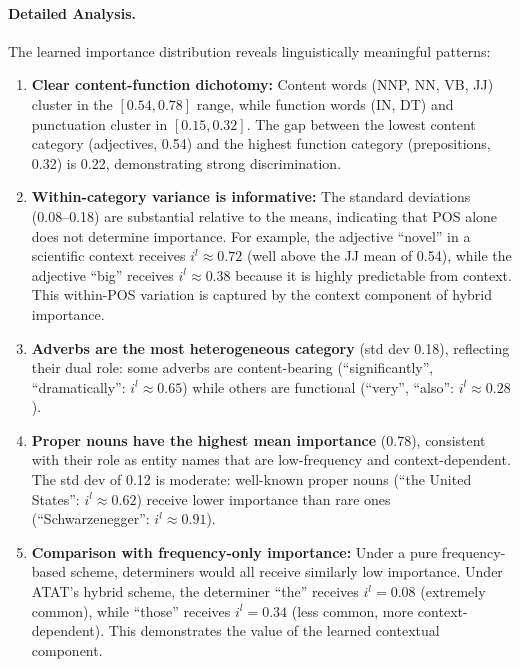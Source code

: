 \paragraph{Detailed Analysis.} The learned importance distribution reveals linguistically meaningful patterns:

\begin{enumerate}[leftmargin=*,itemsep=2pt]
    \item \textbf{Clear content-function dichotomy:} Content words (NNP, NN, VB, JJ) cluster in the $[0.54, 0.78]$ range, while function words (IN, DT) and punctuation cluster in $[0.15, 0.32]$. The gap between the lowest content category (adjectives, 0.54) and the highest function category (prepositions, 0.32) is 0.22, demonstrating strong discrimination.
    
    \item \textbf{Within-category variance is informative:} The standard deviations (0.08--0.18) are substantial relative to the means, indicating that POS alone does not determine importance. For example, the adjective ``novel'' in a scientific context receives $i^l \approx 0.72$ (well above the JJ mean of 0.54), while the adjective ``big'' receives $i^l \approx 0.38$ because it is highly predictable from context. This within-POS variation is captured by the context component of hybrid importance.
    
    \item \textbf{Adverbs are the most heterogeneous category} (std dev 0.18), reflecting their dual role: some adverbs are content-bearing (``significantly'', ``dramatically'': $i^l \approx 0.65$) while others are functional (``very'', ``also'': $i^l \approx 0.28$).
    
    \item \textbf{Proper nouns have the highest mean importance} (0.78), consistent with their role as entity names that are low-frequency and context-dependent. The std dev of 0.12 is moderate: well-known proper nouns (``the United States'': $i^l \approx 0.62$) receive lower importance than rare ones (``Schwarzenegger'': $i^l \approx 0.91$).
    
    \item \textbf{Comparison with frequency-only importance:} Under a pure frequency-based scheme, determiners would all receive similarly low importance. Under ATAT's hybrid scheme, the determiner ``the'' receives $i^l = 0.08$ (extremely common), while ``those'' receives $i^l = 0.34$ (less common, more context-dependent). This demonstrates the value of the learned contextual component.
\end{enumerate}

